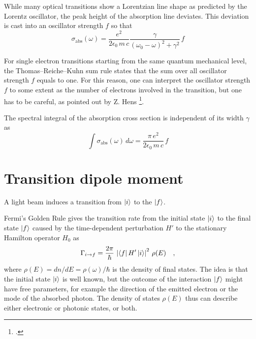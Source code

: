 While many optical transitions show a Lorentzian line shape as predicted by the Lorentz oscillator, the peak height of the absorption line deviates. This deviation is cast into an oscillator strength $f$ so that 
\begin{equation}
 \sigma_{\text{abs}}(\omega) =   \frac{e^2  }{2 \epsilon_0 \,  m \, c}  \frac{\gamma  }{(\omega_0 - \omega)^2 +  \gamma ^2}  \, f
\end{equation}

For single electron transitions starting from the same quantum mechanical level, the Thomas–Reiche–Kuhn sum rule states that the sum over all oscillator strength $f$ equals to one. For this reason, one can interpret the oscillator strength  $f$  to some extent  as the number of electrons involved in  the transition, but one has to be careful, as pointed out by Z. Hens \footcite{Hens:2008kr}.

The spectral integral of the absorption cross section is independent of its width $\gamma$ as
\begin{equation}
 \int \sigma_{\text{abs}}(\omega)  \, d \omega =
   \frac{\pi \, e^2  }{2 \epsilon_0 \,  m \, c} \, f
\end{equation}


\section{Transition dipole moment}

\begin{marginfigure}
\caption{A light beam induces a transition from $\ket{i}$ to the  $\ket{f}$.}
\end{marginfigure}

Fermi's Golden Rule gives the transition rate from the initial state $\ket{i}$ to the final state $\ket{f}$ caused by the time-dependent perturbation $H'$ to the stationary Hamilton operator $H_0$ as
\begin{equation}
 \Gamma_{i \rightarrow f} = \frac{2 \pi}{\hbar} \, \left| \bra{f} H' \ket{i} \right|^2 \, \rho(E) \quad ,
\end{equation}
where  $\rho(E) = d n / d E = \rho(\omega) / \hbar$ is the density of final states. The idea is that the initial state  $\ket{i}$ is well known, but the outcome of the interaction $\ket{f}$ might have free parameters, for example the direction of the emitted electron or the mode of the absorbed photon. The density of states   $\rho(E)$ thus can describe either electronic or photonic states, or both.





